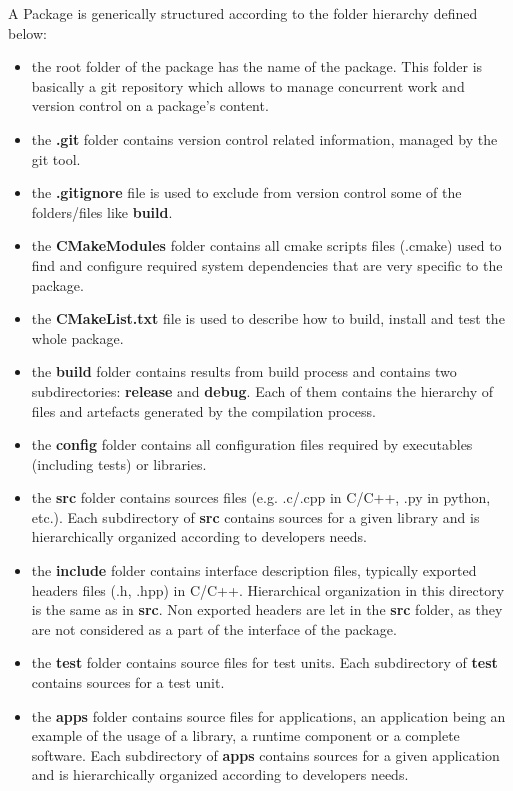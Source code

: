 \documentclass[12pt,a4paper]{article}
\begin{document}
A Package is generically structured according to the folder hierarchy defined below:
\begin{itemize}
\item the root folder of the package has the name of the package. This folder is basically a git repository which allows to manage concurrent work and version control on a package's content.
\item the \textbf{.git} folder contains version control related information, managed by the git tool.
\item the \textbf{.gitignore} file is used to exclude from version control some of the folders/files like \textbf{build}.
\item the \textbf{CMakeModules} folder contains all cmake scripts files (.cmake) used to find and configure required system dependencies that are very specific to the package. 
\item the \textbf{CMakeList.txt} file is used to describe how to build, install and test the whole package. 
\item the \textbf{build} folder contains results from build process and contains two subdirectories: \textbf{release} and \textbf{debug}. Each of them contains the hierarchy of files and artefacts generated by the compilation process.
\item the \textbf{config} folder contains all configuration files required by executables (including tests) or libraries.
\item the \textbf{src} folder contains sources files (e.g. .c/.cpp in C/C++, .py in python, etc.). Each subdirectory of \textbf{src} contains sources for a given library and is hierarchically organized according to developers needs.
\item the \textbf{include} folder contains interface description files, typically exported headers files (.h, .hpp) in C/C++. Hierarchical organization in this directory is the same as in \textbf{src}. Non exported headers are let in the \textbf{src} folder, as they are not considered as a part of the interface of the package.
\item the \textbf{test} folder contains source files for test units. Each subdirectory of \textbf{test} contains sources for a test unit.
\item the \textbf{apps} folder contains source files for applications, an application being an example of the usage of a library, a runtime component or a complete software. Each subdirectory of \textbf{apps} contains sources for a given application and is hierarchically organized according to developers needs. 

\end{itemize}
\end{document}

